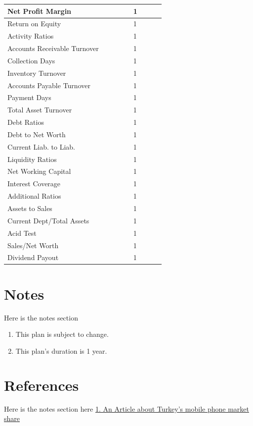 \documentclass[11pt,titlepage]{article}
\begin{document}
\begin{landscape}
\begin{scriptsize}
\begin{tabular}{ | l | l | l | l | l | l | l | l | l |}
  Net Profit Margin & & & & & 1 \\ \hline
  Return on Equity & & & & & 1 \\ \hline
  Activity Ratios & & & & & 1 \\ \hline
  Accounts Receivable Turnover & & & & & 1 \\ \hline
  Collection Days & & & & & 1 \\ \hline
  Inventory Turnover & & & & & 1 \\ \hline
  Accounts Payable Turnover & & & & & 1 \\ \hline
  Payment Days & & & & & 1 \\ \hline
  Total Asset Turnover & & & & & 1 \\ \hline
  Debt Ratios & & & & & 1 \\ \hline
  Debt to Net Worth & & & & & 1 \\ \hline
  Current Liab. to Liab. & & & & & 1 \\ \hline
  Liquidity Ratios & & & & & 1 \\ \hline
  Net Working Capital & & & & & 1 \\ \hline
  Interest Coverage & & & & & 1 \\ \hline
  Additional Ratios & & & & & 1 \\ \hline
  Assets to Sales & & & & & 1 \\ \hline
  Current Dept/Total Assets & & & & & 1 \\ \hline
  Acid Test & & & & & 1 \\ \hline
  Sales/Net Worth & & & & & 1 \\ \hline
  Dividend Payout & & & & & 1 \\ \hline
\end{tabular}
\end{scriptsize}
\end{landscape}

\pagebreak

\section{Notes}
Here is the notes section
\begin{enumerate}
\item This plan is subject to change.
\item This plan's duration is 1 year.
\end{enumerate}

\section{References}
Here is the notes section\newline
\hypertarget{market_share}{here}\newline
\href{http://http://sayarbilgi.net/mobil-aygitlar/7-mobil-aygit-haberleri/88-turkiyenin-en-cok-satan-cep-telefonlari.html}{1. An Article about Turkey's mobile phone market share}
\end{document}
